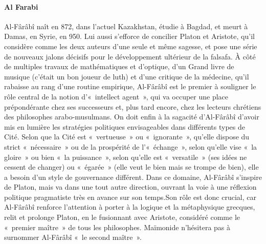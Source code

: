 \paragraph{Al Farabi}   
Al-Fârâbî naît en 872, dans l’actuel Kazakhstan, étudie à Bagdad, et meurt à Damas, en Syrie, en 950. Lui aussi s’efforce de concilier Platon et Aristote, qu’il considère comme les deux auteurs d’une seule et même sagesse, et pose une série de nouveaux jalons décisifs pour le développement
ultérieur de la falsafa. À côté de multiples travaux de mathématiques et d’optique, d’un Grand livre de musique (c’était un bon joueur de luth) et d’une critique de la médecine, qu’il rabaisse au rang d’une routine empirique, Al-Fârâbî est le premier à souligner le rôle central de la notion d’« intellect agent », qui va occuper une place prépondérante chez ses successeurs et, plus tard encore, chez les lecteurs chrétiens des philosophes arabo-musulmans. On doit enfin à la sagacité d’Al-Fârâbî d’avoir mis en lumière les stratégies politiques envisageables dans différents types de Cité. Selon que la Cité est « vertueuse » ou « ignorante », qu’elle dispose du strict « nécessaire » ou de la prospérité de l’« échange », selon qu’elle vise « la gloire » ou bien « la puissance », selon qu’elle est « versatile » (ses idées ne cessent de changer) ou « égarée » (elle veut le bien mais se trompe de bien), elle a besoin d’un style de gouvernance différent. Dans ce domaine, Al-Fârâbî s’inspire de Platon, mais va dans une tout autre direction, ouvrant la voie à une réflexion politique pragmatiste très en avance sur son temps.Son rôle est donc crucial, car Al-Fârâbî renforce l’attention à porter à la logique et la métaphysique grecques, relit et prolonge Platon, en le fusionnant avec Aristote, considéré comme le « premier maître » de tous les philosophes. Maïmonide n’hésitera pas à surnommer Al-Fârâbî « le second maître ».


